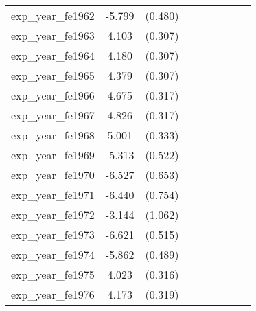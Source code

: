 {\begin{tabular}{l*{4}{cc}}
exp\_year\_fe1962&   -5.799\sym{***}&  (0.480)&                  &         &                  &         &                  &         \\
exp\_year\_fe1963&    4.103\sym{***}&  (0.307)&                  &         &                  &         &                  &         \\
exp\_year\_fe1964&    4.180\sym{***}&  (0.307)&                  &         &                  &         &                  &         \\
exp\_year\_fe1965&    4.379\sym{***}&  (0.307)&                  &         &                  &         &                  &         \\
exp\_year\_fe1966&    4.675\sym{***}&  (0.317)&                  &         &                  &         &                  &         \\
exp\_year\_fe1967&    4.826\sym{***}&  (0.317)&                  &         &                  &         &                  &         \\
exp\_year\_fe1968&    5.001\sym{***}&  (0.333)&                  &         &                  &         &                  &         \\
exp\_year\_fe1969&   -5.313\sym{***}&  (0.522)&                  &         &                  &         &                  &         \\
exp\_year\_fe1970&   -6.527\sym{***}&  (0.653)&                  &         &                  &         &                  &         \\
exp\_year\_fe1971&   -6.440\sym{***}&  (0.754)&                  &         &                  &         &                  &         \\
exp\_year\_fe1972&   -3.144\sym{**} &  (1.062)&                  &         &                  &         &                  &         \\
exp\_year\_fe1973&   -6.621\sym{***}&  (0.515)&                  &         &                  &         &                  &         \\
exp\_year\_fe1974&   -5.862\sym{***}&  (0.489)&                  &         &                  &         &                  &         \\
exp\_year\_fe1975&    4.023\sym{***}&  (0.316)&                  &         &                  &         &                  &         \\
exp\_year\_fe1976&    4.173\sym{***}&  (0.319)&                  &         &                  &         &                  &         \\

\end{tabular}}
